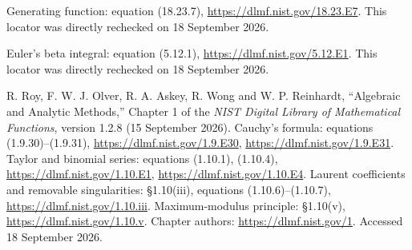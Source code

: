 
Generating function: equation (18.23.7),
\url{https://dlmf.nist.gov/18.23.E7}.
This locator was directly rechecked on 18 September 2026.

Euler's beta integral: equation (5.12.1),
\url{https://dlmf.nist.gov/5.12.E1}.
This locator was directly rechecked on 18 September 2026.

R. Roy, F. W. J. Olver, R. A. Askey, R. Wong and W. P. Reinhardt,
``Algebraic and Analytic Methods,'' Chapter 1 of the
\emph{NIST Digital Library of Mathematical Functions},
version 1.2.8 (15 September 2026).
Cauchy's formula: equations (1.9.30)--(1.9.31),
\url{https://dlmf.nist.gov/1.9.E30},
\url{https://dlmf.nist.gov/1.9.E31}.
Taylor and binomial series: equations (1.10.1), (1.10.4),
\url{https://dlmf.nist.gov/1.10.E1},
\url{https://dlmf.nist.gov/1.10.E4}.
Laurent coefficients and removable singularities: \S1.10(iii),
equations (1.10.6)--(1.10.7),
\url{https://dlmf.nist.gov/1.10.iii}.
Maximum-modulus principle: \S1.10(v),
\url{https://dlmf.nist.gov/1.10.v}.
Chapter authors: \url{https://dlmf.nist.gov/1}.
Accessed 18 September 2026.
